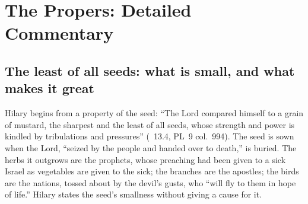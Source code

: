 
\section{The Propers: Detailed Commentary}

\subsection{The least of all seeds: what is small, and what makes it great}

Hilary begins from a property of the seed: ``The Lord compared himself to a
grain of mustard, the sharpest and the least of all seeds, whose strength and
power is kindled by tribulations and pressures'' (~13.4,
PL~9 col.~994). The seed is sown when the Lord, ``seized by the people and
handed over to death,'' is buried. The herbs it outgrows are the prophets,
whose preaching had been given to a sick Israel as vegetables are given to the
sick; the branches are the apostles; the birds are the nations, tossed about
by the devil's gusts, who ``will fly to them in hope of life.'' Hilary states
the seed's smallness without giving a cause for it.

